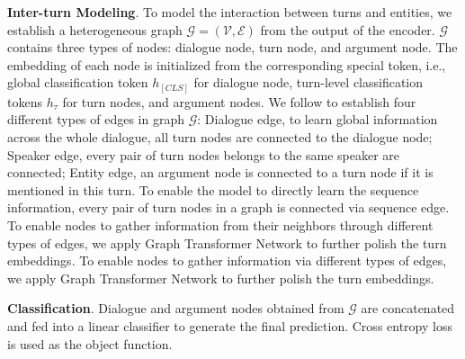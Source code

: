 \textbf{Inter-turn Modeling}. To model the interaction between turns and entities, we establish a heterogeneous graph $\mathcal{G}=(\mathcal{V},\mathcal{E})$ from the output of the encoder. $\mathcal{G}$ contains three types of nodes: dialogue node, turn node, and argument node. The embedding of each node is initialized from the corresponding special token, i.e., global classification token $h_{[CLS]}$ for dialogue node, turn-level classification tokens $h_\tau$ for turn nodes, and argument nodes. 
We follow \citet{lee2021graph} to establish four different types of edges in graph $\mathcal{G}$: Dialogue edge, to learn global information across the whole dialogue, all turn nodes are connected to the dialogue node; Speaker edge, every pair of turn nodes belongs to the same speaker are connected; Entity edge, an argument node is connected to a turn node if it is mentioned in this turn. To enable the model to directly learn the sequence information, every pair of turn nodes in a graph is connected via sequence edge. To enable nodes to gather information from their neighbors through different types of edges, we apply Graph Transformer Network \citep{yun2019graphtransformernetwork} to further polish the turn embeddings. 
To enable nodes to gather information via different types of edges, we apply Graph Transformer Network \citep{yun2019graphtransformernetwork} to further polish the turn embeddings. 

\textbf{Classification}. Dialogue and argument nodes obtained from $\mathcal{G}$ are concatenated and fed into a linear classifier to generate the final prediction. Cross entropy loss is used as the object function.  





